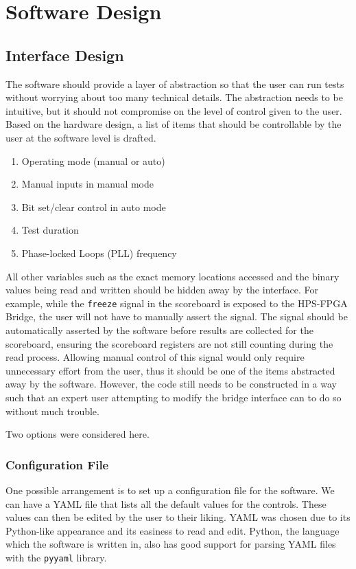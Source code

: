 \chapter{Software Design}

\section{Interface Design}
The software should provide a layer of abstraction so that the user can run tests without worrying about too many technical details.
The abstraction needs to be intuitive, but it should not compromise on the level of control given to the user.
Based on the hardware design, a list of items that should be controllable by the user at the software level is drafted.

\begin{enumerate}
  \setlength\itemsep{0pt}
  \item Operating mode (manual or auto)
  \item Manual inputs in manual mode
  \item Bit set/clear control in auto mode
  \item Test duration
  \item Phase-locked Loops (PLL) frequency
\end{enumerate}

All other variables such as the exact memory locations accessed and the binary values being read and written should be hidden away by the interface.
For example, while the \texttt{freeze} signal in the scoreboard is exposed to the HPS-FPGA Bridge, the user will not have to manually assert the signal.
The signal should be automatically asserted by the software before results are collected for the scoreboard, ensuring the scoreboard registers are not still counting during the read process.
Allowing manual control of this signal would only require unnecessary effort from the user, thus it should be one of the items abstracted away by the software.
However, the code still needs to be constructed in a way such that an expert user attempting to modify the bridge interface can to do so without much trouble.

Two options were considered here.

\subsection{Configuration File}
One possible arrangement is to set up a configuration file for the software.
We can have a YAML file that lists all the default values for the controls.
These values can then be edited by the user to their liking.
YAML was chosen due to its Python-like appearance and its easiness to read and edit.
Python, the language which the software is written in, also has good support for parsing YAML files with the \texttt{pyyaml} library.

